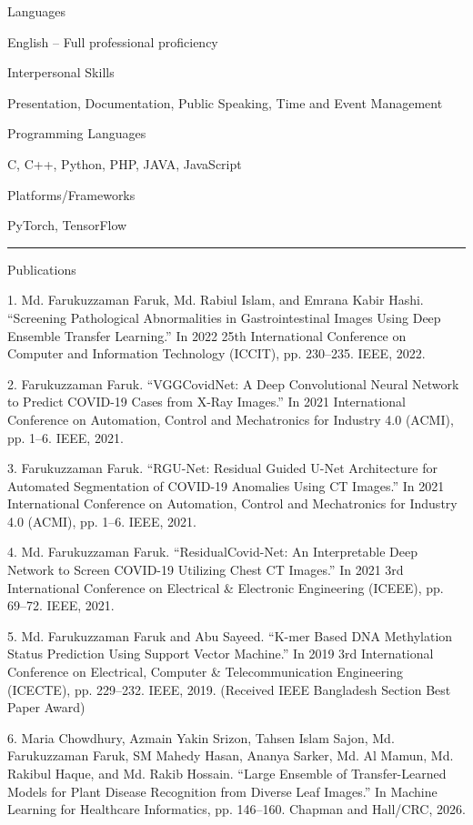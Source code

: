 \documentclass[a4paper,10pt]{article}
\newlength{\cvcolumngapwidth}
\newlength{\cvleftcolumnwidth}
\newlength{\cvrightcolumnwidth}
\newcommand{\cvsectionstyle}[1]{{\normalsize\cvsectionfont\textcolor{cvsectioncolor}{#1}}}
\newcommand{\cvdurationstyle}[1]{{\small\cvdurationfont\textcolor{cvdurationcolor}{#1}}}
\newcommand{\cvheadingstyle}[1]{{\normalsize\cvheadingfont\textcolor{cvheadingcolor}{#1}}}
\newlength{\cvafteritemskipamount}
\newlength{\cvaftersectionskipamount}
\newlength{\cvparskip}
\newcommand{\cvsection}[1]{
    \begin{minipage}[t]{\cvleftcolumnwidth}
        \raggedleft\cvsectionstyle{#1}
    \end{minipage}%
    \hspace{\cvcolumngapwidth}%
    \begin{minipage}[t]{\cvrightcolumnwidth}
        \textcolor{cvrulecolor}{\rule{\cvrightcolumnwidth}{0.3mm}}
    \end{minipage}

    \vspace{\cvaftersectionskipamount}
}
\newcommand{\cvitem}[2]{
    \begin{minipage}[t]{\cvleftcolumnwidth}
        \raggedleft #1
    \end{minipage}%
    \hspace{\cvcolumngapwidth}%
    \begin{minipage}[t]{\cvrightcolumnwidth}
        \setlength{\parskip}{\cvparskip} #2
    \end{minipage}

    \vspace{\cvafteritemskipamount}
}
\begin{document}
\cvitem{
    \cvheadingstyle{Languages}
}{
    English -- Full professional proficiency
}

\cvitem{
    \cvheadingstyle{Interpersonal Skills}
}{
    Presentation, Documentation, Public Speaking, Time and Event Management
}

\cvitem{
    \cvheadingstyle{Programming Languages}
}{
    C, C++, Python, PHP, JAVA, JavaScript
}

\cvitem{
    \cvheadingstyle{Platforms/Frameworks}
}{
    PyTorch, TensorFlow
}


\cvsection{PUBLICATIONS}

\cvitem{
    \cvheadingstyle{Publications}
}{
1. Md. Farukuzzaman Faruk, Md. Rabiul Islam, and Emrana Kabir Hashi. “Screening Pathological Abnormalities in Gastrointestinal Images Using Deep Ensemble Transfer Learning.” In 2022 25th International Conference on Computer and Information Technology (ICCIT), pp. 230–235. IEEE, 2022.
}

\cvitem{
    \cvdurationstyle{}
}{
2. Farukuzzaman Faruk. “VGGCovidNet: A Deep Convolutional Neural Network to Predict COVID-19 Cases from X-Ray Images.” In 2021 International Conference on Automation, Control and Mechatronics for Industry 4.0 (ACMI), pp. 1–6. IEEE, 2021.
}

\cvitem{
    \cvdurationstyle{}
}{
3. Farukuzzaman Faruk. “RGU-Net: Residual Guided U-Net Architecture for Automated Segmentation of COVID-19 Anomalies Using CT Images.” In 2021 International Conference on Automation, Control and Mechatronics for Industry 4.0 (ACMI), pp. 1–6. IEEE, 2021.
}

\cvitem{
    \cvdurationstyle{}
}{
4. Md. Farukuzzaman Faruk. “ResidualCovid-Net: An Interpretable Deep Network to Screen COVID-19 Utilizing Chest CT Images.” In 2021 3rd International Conference on Electrical \& Electronic Engineering (ICEEE), pp. 69–72. IEEE, 2021.
}

\cvitem{
    \cvdurationstyle{}
}{
5. Md. Farukuzzaman Faruk and Abu Sayeed. “K-mer Based DNA Methylation Status Prediction Using Support Vector Machine.” In 2019 3rd International Conference on Electrical, Computer \& Telecommunication Engineering (ICECTE), pp. 229–232. IEEE, 2019. (Received IEEE Bangladesh Section Best Paper Award)
}

\cvitem{
    \cvdurationstyle{}
}{
6. Maria Chowdhury, Azmain Yakin Srizon, Tahsen Islam Sajon, Md. Farukuzzaman Faruk, SM Mahedy Hasan, Ananya Sarker, Md. Al Mamun, Md. Rakibul Haque, and Md. Rakib Hossain. “Large Ensemble of Transfer-Learned Models for Plant Disease Recognition from Diverse Leaf Images.” In Machine Learning for Healthcare Informatics, pp. 146–160. Chapman and Hall/CRC, 2026.
}
\end{document}
